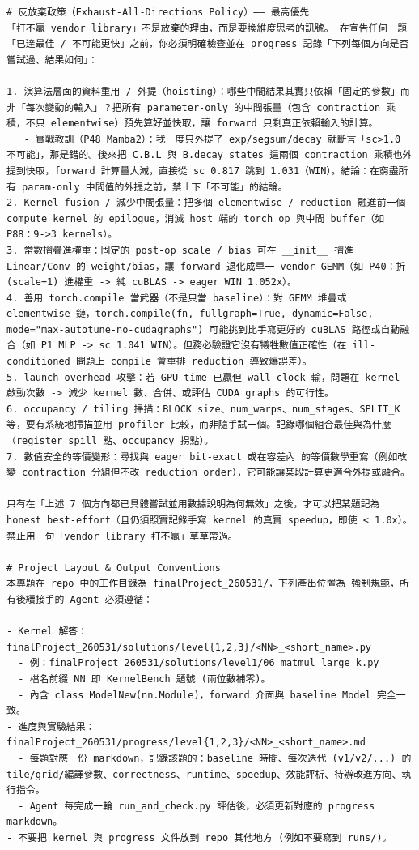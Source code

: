 \documentclass[conference]{IEEEtran}
\begin{document}
\begin{lstlisting}
# 反放棄政策（Exhaust-All-Directions Policy）—— 最高優先
「打不贏 vendor library」不是放棄的理由，而是要換維度思考的訊號。 在宣告任何一題「已達最佳 / 不可能更快」之前，你必須明確檢查並在 progress 記錄「下列每個方向是否嘗試過、結果如何」：

1. 演算法層面的資料重用 / 外提（hoisting）：哪些中間結果其實只依賴「固定的參數」而非「每次變動的輸入」？把所有 parameter-only 的中間張量（包含 contraction 乘積，不只 elementwise）預先算好並快取，讓 forward 只剩真正依賴輸入的計算。
   - 實戰教訓（P48 Mamba2）：我一度只外提了 exp/segsum/decay 就斷言「sc>1.0 不可能」，那是錯的。後來把 C.B.L 與 B.decay_states 這兩個 contraction 乘積也外提到快取，forward 計算量大減，直接從 sc 0.817 跳到 1.031（WIN）。結論：在窮盡所有 param-only 中間值的外提之前，禁止下「不可能」的結論。
2. Kernel fusion / 減少中間張量：把多個 elementwise / reduction 融進前一個 compute kernel 的 epilogue，消滅 host 端的 torch op 與中間 buffer（如 P88：9->3 kernels）。
3. 常數摺疊進權重：固定的 post-op scale / bias 可在 __init__ 摺進 Linear/Conv 的 weight/bias，讓 forward 退化成單一 vendor GEMM（如 P40：折 (scale+1) 進權重 -> 純 cuBLAS -> eager WIN 1.052x）。
4. 善用 torch.compile 當武器（不是只當 baseline）：對 GEMM 堆疊或 elementwise 鏈，torch.compile(fn, fullgraph=True, dynamic=False, mode="max-autotune-no-cudagraphs") 可能挑到比手寫更好的 cuBLAS 路徑或自動融合（如 P1 MLP -> sc 1.041 WIN）。但務必驗證它沒有犧牲數值正確性（在 ill-conditioned 問題上 compile 會重排 reduction 導致爆誤差）。
5. launch overhead 攻擊：若 GPU time 已贏但 wall-clock 輸，問題在 kernel 啟動次數 -> 減少 kernel 數、合併、或評估 CUDA graphs 的可行性。
6. occupancy / tiling 掃描：BLOCK size、num_warps、num_stages、SPLIT_K 等，要有系統地掃描並用 profiler 比較，而非隨手試一個。記錄哪個組合最佳與為什麼（register spill 點、occupancy 拐點）。
7. 數值安全的等價變形：尋找與 eager bit-exact 或在容差內 的等價數學重寫（例如改變 contraction 分組但不改 reduction order），它可能讓某段計算更適合外提或融合。

只有在「上述 7 個方向都已具體嘗試並用數據說明為何無效」之後，才可以把某題記為 honest best-effort（且仍須照實記錄手寫 kernel 的真實 speedup，即使 < 1.0x）。禁止用一句「vendor library 打不贏」草草帶過。

# Project Layout & Output Conventions
本專題在 repo 中的工作目錄為 finalProject_260531/，下列產出位置為 強制規範，所有後續接手的 Agent 必須遵循：

- Kernel 解答：finalProject_260531/solutions/level{1,2,3}/<NN>_<short_name>.py
  - 例：finalProject_260531/solutions/level1/06_matmul_large_k.py
  - 檔名前綴 NN 即 KernelBench 題號 (兩位數補零)。
  - 內含 class ModelNew(nn.Module)，forward 介面與 baseline Model 完全一致。
- 進度與實驗結果：finalProject_260531/progress/level{1,2,3}/<NN>_<short_name>.md
  - 每題對應一份 markdown，記錄該題的：baseline 時間、每次迭代 (v1/v2/...) 的 tile/grid/編譯參數、correctness、runtime、speedup、效能評析、待辦改進方向、執行指令。
  - Agent 每完成一輪 run_and_check.py 評估後，必須更新對應的 progress markdown。
- 不要把 kernel 與 progress 文件放到 repo 其他地方 (例如不要寫到 runs/)。


\end{lstlisting}
\end{document}
